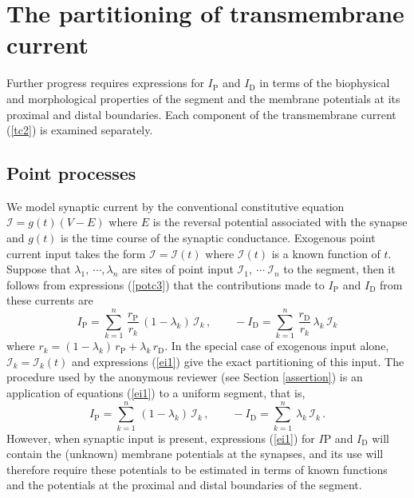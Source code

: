 \section{The partitioning of transmembrane current}\label{part}

Further progress requires expressions for $I_\mathrm{P}$ and
$I_\mathrm{D}$ in terms of the biophysical and morphological
properties of the segment and the membrane potentials at its
proximal and distal boundaries. Each component of the
transmembrane current (\ref{tc2}) is examined separately.

\subsection{Point processes}\label{PointInput}

We model synaptic current by the conventional constitutive
equation $\mathcal{I}=g(t)(V-E)$ where $E$ is the reversal
potential associated with the synapse and $g(t)$ is the time
course of the synaptic conductance. Exogenous point current input
takes the form $\mathcal{I}=\mathcal{I}(t)$ where $\mathcal{I}(t)$
is a known function of $t$. Suppose that $\lambda_1,\
\cdots,\lambda_n$ are sites of point input $\mathcal{I}_1,\
\cdots\ \mathcal{I}_n$ to the segment, then it follows from
expressions (\ref{potc3}) that the contributions made to
$I_\mathrm{P}$ and $I_\mathrm{D}$ from these currents are
\begin{equation}\label{ei1}
I_\mathrm{P} = \sum_{k=1}^n\,
\frac{r_\mathrm{P}}{r_k}\,(1-\lambda_k)\,\mathcal{I}_k\,,\qquad
-I_\mathrm{D} = \sum_{k=1}^n\,
\frac{r_\mathrm{D}}{r_k}\,\lambda_k\,\mathcal{I}_k
\end{equation}
where $r_k=(1-\lambda_k)\,r_\mathrm{P} +\lambda_k\,r_\mathrm{D}$.
In the special case of exogenous input alone,
$\mathcal{I}_k=\mathcal{I}_k(t)$ and expressions (\ref{ei1}) give
the exact partitioning of this input. The procedure used by the
anonymous reviewer (see Section \ref{assertion}) is an application
of equations (\ref{ei1}) to a uniform segment, that is,
\begin{equation}\label{ei11}
I_\mathrm{P} = \sum_{k=1}^n\,
(1-\lambda_k)\,\mathcal{I}_k\,,\qquad -I_\mathrm{D} =
\sum_{k=1}^n\, \lambda_k\,\mathcal{I}_k\,.
\end{equation}
However, when synaptic input is present, expressions (\ref{ei1})
for $I\mathrm{P}$ and $I_\mathrm{D}$ will contain the (unknown)
membrane potentials at the synapses, and its use will therefore
require these potentials to be estimated in terms of known
functions and the potentials at the proximal and distal boundaries
of the segment.

